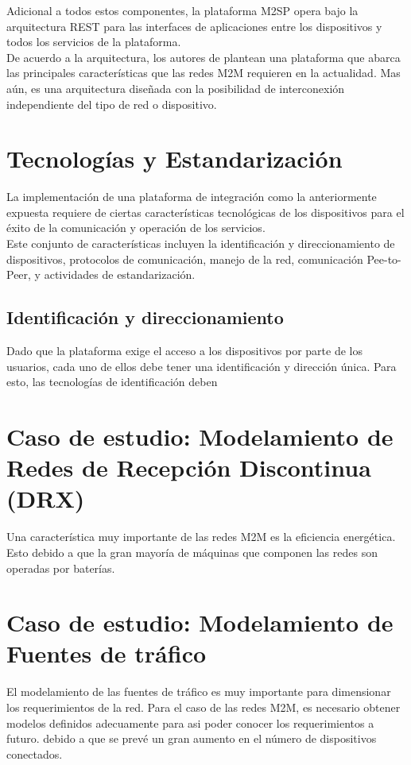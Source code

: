 \documentclass[journal]{IEEEtran}
\begin{document}
Adicional a todos estos componentes, la plataforma M2SP opera bajo la arquitectura REST para las interfaces de aplicaciones entre los dispositivos y todos los servicios de la plataforma.\\

De acuerdo a la arquitectura, los autores de \cite{paper1} plantean una plataforma que abarca las principales características que las redes M2M requieren en la actualidad. Mas aún, es una arquitectura diseñada con la posibilidad de interconexión independiente del tipo de red o dispositivo.

\section{Tecnologías y Estandarización}

La implementación de una plataforma de integración como la anteriormente expuesta requiere de ciertas características tecnológicas de los dispositivos para el éxito de la comunicación y operación de los servicios.\\

Este conjunto de características incluyen la identificación y direccionamiento de dispositivos, protocolos de comunicación, manejo de la red, comunicación Pee-to-Peer, y actividades de estandarización.

\subsection{Identificación y direccionamiento}

Dado que la plataforma exige el acceso a los dispositivos por parte de los usuarios, cada uno de ellos debe tener una identificación y dirección única. Para esto, las tecnologías de identificación deben

\section{Caso de estudio: Modelamiento de Redes de Recepción Discontinua (DRX)}

Una característica muy importante de las redes M2M es la eficiencia energética. Esto debido a que la gran mayoría de máquinas que componen las redes son operadas por baterías.

\section{Caso de estudio: Modelamiento de Fuentes de tráfico}
El modelamiento de las fuentes de tráfico es muy importante para dimensionar los requerimientos de la red. Para el caso de las redes M2M, es necesario obtener modelos definidos adecuamente para asi poder conocer los requerimientos a futuro. debido a que se prevé un gran aumento en el número de dispositivos conectados.\\
\end{document}

